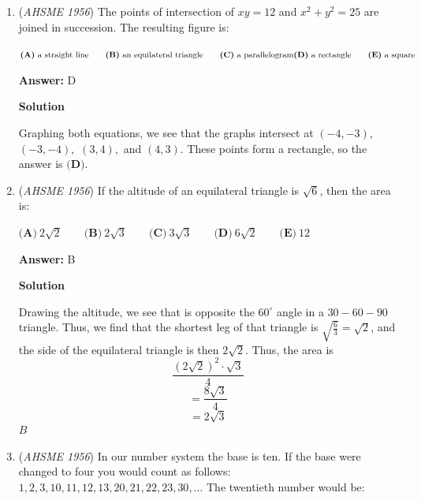 \begin{enumerate}
 $\textbf{(A)}\ \textdollar{3500}\qquad \textbf{(B)}\ \textdollar{5500}\qquad \textbf{(C)}\ \textdollar{6500}\qquad \textbf{(D)}\ \textdollar{7000}\qquad \textbf{(E)}\ \textdollar{7500}$

 \textbf{Answer: }D



\textbf{Solution}

The wife, daughter, son, and cook received estates in the ratio $6:4:3:1.$ The estate is worth $6+4+3+1 = 14$ units of $\$500.,$ which is $\boxed{\textbf{(D)}\ \textdollar{7000}.}$



	\item (\textit{AHSME 1956}) The points of intersection of $xy = 12$ and $x^2 + y^2 = 25$ are joined in succession. The resulting figure is: 


 $\textbf{(A)}\ \text{a straight line}\qquad \textbf{(B)}\ \text{an equilateral triangle}\qquad \textbf{(C)}\ \text{a parallelogram} \\ \textbf{(D)}\ \text{a rectangle} \qquad \textbf{(E)}\ \text{a square}$

 \textbf{Answer: }D



\textbf{Solution}

Graphing both equations, we see that the graphs intersect at $(-4, -3),$ $(-3, -4),$ $(3, 4),$ and $(4, 3).$ These points form a rectangle, so the answer is $\boxed{\textbf{(D)}}.$



	\item (\textit{AHSME 1956}) If the altitude of an equilateral triangle is $\sqrt {6}$, then the area is: 


 $\textbf{(A)}\ 2\sqrt{2}\qquad\textbf{(B)}\ 2\sqrt{3}\qquad\textbf{(C)}\ 3\sqrt{3}\qquad\textbf{(D)}\ 6\sqrt{2}\qquad\textbf{(E)}\ 12$

 \textbf{Answer: }B



\textbf{Solution}

Drawing the altitude, we see that is opposite the $60^{\circ}$ angle in a $30-60-90$ triangle. Thus, we find that the shortest leg of that triangle is $\sqrt{\frac{6}{3}} = \sqrt{2}$, and the side of the equilateral triangle is then $2\sqrt{2}$. Thus, the area is
 \[\frac{(2\sqrt 2)^2 \cdot \sqrt{3}}{4}\] 
 \[= \frac{8 \sqrt{3}}{4}\] 
 \[= 2 \sqrt {3}\]$\boxed{B}$



	\item (\textit{AHSME 1956}) In our number system the base is ten. If the base were changed to four you would count as follows: 
$1,2,3,10,11,12,13,20,21,22,23,30,\ldots$ The twentieth number would be: 



\end{enumerate}
